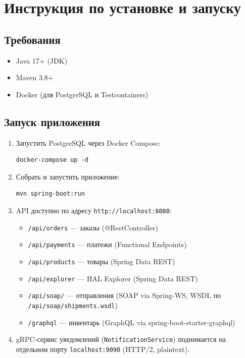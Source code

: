 \section{Инструкция по установке и запуску}

\subsection{Требования}

\begin{itemize}
    \item Java 17+ (JDK)
    \item Maven 3.8+
    \item Docker (для PostgreSQL и Testcontainers)
\end{itemize}

\subsection{Запуск приложения}

\begin{enumerate}
    \item Запустить PostgreSQL через Docker Compose:
\begin{verbatim}
docker-compose up -d
\end{verbatim}

    \item Собрать и запустить приложение:
\begin{verbatim}
mvn spring-boot:run
\end{verbatim}

    \item API доступно по адресу \texttt{http://localhost:8080}:
    \begin{itemize}
        \item \texttt{/api/orders} --- заказы (@RestController)
        \item \texttt{/api/payments} --- платежи (Functional Endpoints)
        \item \texttt{/api/products} --- товары (Spring Data REST)
        \item \texttt{/api/explorer} --- HAL Explorer (Spring Data REST)
        \item \texttt{/api/soap/} --- отправления (SOAP via Spring-WS, WSDL по \texttt{/api/soap/shipments.wsdl})
        \item \texttt{/graphql} --- инвентарь (GraphQL via spring-boot-starter-graphql)
    \end{itemize}
    \item gRPC-сервис уведомлений (\texttt{NotificationService}) поднимается на отдельном порту \texttt{localhost:9090} (HTTP/2, plaintext).
\end{enumerate}

